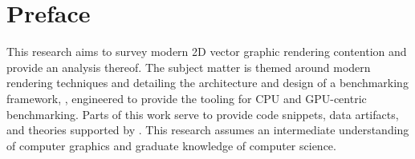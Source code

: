 \section*{Preface}\label{sec:preface}
This research aims to survey modern 2D vector graphic rendering contention and provide an analysis thereof. The subject matter is themed around modern rendering techniques and detailing the architecture and design of a benchmarking framework, \textit{\toollinkedname}, engineered to provide the tooling for CPU and GPU-centric benchmarking. Parts of this work serve to provide code snippets, data artifacts, and theories supported by \textit{\toollinkedname}. This research assumes an intermediate understanding of computer graphics and graduate knowledge of computer science.